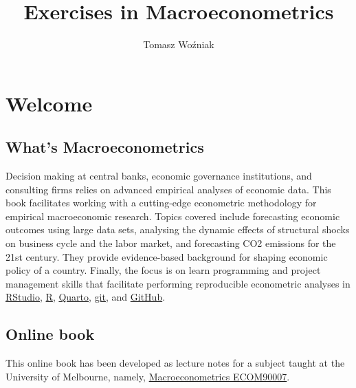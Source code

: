 \documentclass[
  letterpaper,
  DIV=11,
  numbers=noendperiod]{scrreprt}
\title{Exercises in Macroeconometrics}
\author{Tomasz Woźniak}
\date{}
\renewcommand*\contentsname{Table of contents}
\newcommand\contentsname{Table of contents}
\begin{document}
\maketitle
\ifdefined\Shaded\renewenvironment{Shaded}{\begin{tcolorbox}[interior hidden, enhanced, borderline west={3pt}{0pt}{shadecolor}, frame hidden, breakable, sharp corners, boxrule=0pt]}{\end{tcolorbox}}\fi

\renewcommand*\contentsname{Table of contents}
{
\hypersetup{linkcolor=}
\setcounter{tocdepth}{2}
\tableofcontents
}

\hypertarget{welcome}{%
\chapter*{Welcome}\label{welcome}}

\hypertarget{whats-macroeconometrics}{%
\section*{What's Macroeconometrics}\label{whats-macroeconometrics}}

Decision making at central banks, economic governance institutions, and
consulting firms relies on advanced empirical analyses of economic data.
This book facilitates working with a cutting-edge econometric
methodology for empirical macroeconomic research. Topics covered include
forecasting economic outcomes using large data sets, analysing the
dynamic effects of structural shocks on business cycle and the labor
market, and forecasting CO2 emissions for the 21st century. They provide
evidence-based background for shaping economic policy of a country.
Finally, the focus is on learn programming and project management skills
that facilitate performing reproducible econometric analyses in
\href{https://www.rstudio.com/}{RStudio},
\href{https://cran.r-project.org/}{R},
\href{https://quarto.org/}{Quarto}, \href{https://git-scm.com/}{git},
and \href{https://GitHub.com/}{GitHub}.

\hypertarget{online-book}{%
\section*{Online book}\label{online-book}}

This online book has been developed as lecture notes for a subject
taught at the University of Melbourne, namely,
\href{https://handbook.unimelb.edu.au/2022/subjects/ecom90007}{Macroeconometrics
ECOM90007}.
\end{document}
